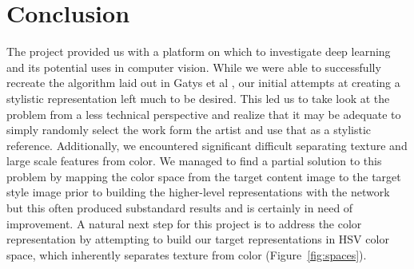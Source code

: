 \documentclass[11pt,letterpaper,journal]{IEEEtran}
\begin{document}
\section{Conclusion}

The project provided us with a platform on which to investigate deep learning
and its potential uses in computer vision. While we were able to successfully
recreate the algorithm laid out in Gatys et al \cite{gatys15},
our initial attempts at creating a stylistic representation left much to be
desired. This led us to take look at the problem from a less technical
perspective and realize that it may be adequate to simply randomly select the
work form the artist and use that as a stylistic reference.  Additionally, we
encountered significant difficult separating texture and large scale features
from color. We managed to find a partial solution to this problem by mapping
the color space from the target content image to the target style image prior
to building the higher-level representations with the network but this often
produced substandard results and is certainly in need of improvement. A natural
next step for this project is to address the color representation by attempting
to build our target representations in HSV color space, which inherently
separates texture from color (Figure~\ref{fig:spaces}).
\end{document}
